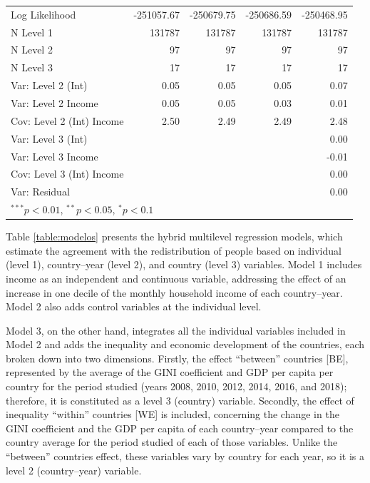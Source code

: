 \documentclass[utf8]{frontiersSCNS} %
\begin{document}
\begin{table}
\begin{tabular}{l D{.}{.}{7.5} D{.}{.}{7.5} D{.}{.}{7.5} D{.}{.}{7.5} }
Log Likelihood                      & -251057.67  & -250679.75  & -250686.59  & -250468.95  \\
N Level 1                           & 131787      & 131787      & 131787      & 131787      \\
N Level 2                           & 97          & 97          & 97          & 97          \\
N Level 3                           & 17          & 17          & 17          & 17          \\
Var: Level 2 (Int)                  & 0.05        & 0.05        & 0.05        & 0.07        \\
Var: Level 2 Income                 & 0.05        & 0.05        & 0.03        & 0.01        \\
Cov: Level 2 (Int) Income           & 2.50        & 2.49        & 2.49        & 2.48        \\
Var: Level 3 (Int)                  &             &             &             & 0.00        \\
Var: Level 3 Income                 &             &             &             & -0.01       \\
Cov: Level 3 (Int) Income           &             &             &             & 0.00        \\
Var: Residual                       &             &             &             & 0.00        \\
\bottomrule
{}
\end{tabular}
\end{table}

Table \ref{table:modelos} presents the hybrid multilevel regression models, which estimate the agreement with the redistribution of people based on individual (level 1), country–year (level 2), and country (level 3) variables. Model 1 includes income as an independent and continuous variable, addressing the effect of an increase in one decile of the monthly household income of each country–year. Model 2 also adds control variables at the individual level.

Model 3, on the other hand, integrates all the individual variables included in Model 2 and adds the inequality and economic development of the countries, each broken down into two dimensions. Firstly, the effect “between” countries [BE], represented by the average of the GINI coefficient and GDP per capita per country for the period studied (years 2008, 2010, 2012, 2014, 2016, and 2018); therefore, it is constituted as a level 3 (country) variable. Secondly, the effect of inequality “within” countries [WE] is included, concerning the change in the GINI coefficient and the GDP per capita of each country–year compared to the country average for the period studied of each of those variables. Unlike the “between” countries effect, these variables vary by country for each year, so it is a level 2 (country–year) variable.
\end{document}

